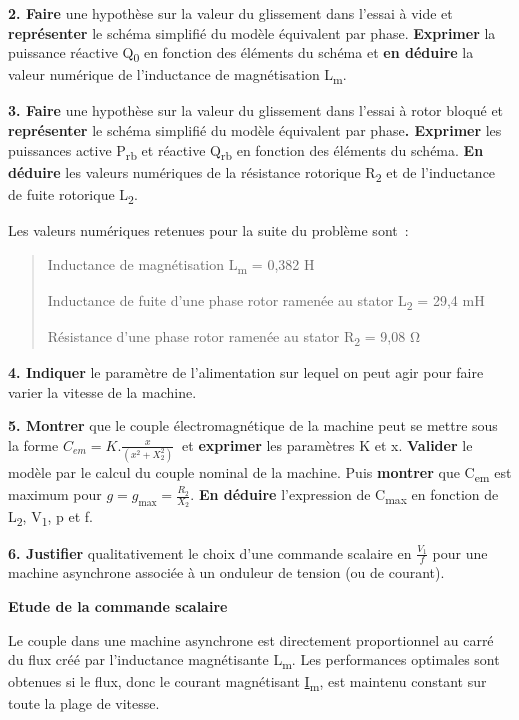 \textbf{2. Faire} une hypothèse sur la valeur du glissement dans l'essai à vide et \textbf{représenter} le schéma simplifié du modèle équivalent par phase. \textbf{Exprimer} la puissance réactive Q\textsubscript{0} en fonction des éléments du schéma et \textbf{en déduire} la valeur numérique de l'inductance de magnétisation L\textsubscript{m}.

\textbf{3. Faire} une hypothèse sur la valeur du glissement dans l'essai à rotor bloqué et \textbf{représenter} le schéma simplifié du modèle équivalent par phase\textbf{. Exprimer} les puissances active P\textsubscript{rb} et réactive Q\textsubscript{rb} en fonction des éléments du schéma. \textbf{En déduire} les valeurs numériques de la résistance rotorique R\textsubscript{2} et de l'inductance de fuite rotorique L\textsubscript{2}.

Les valeurs numériques retenues pour la suite du problème sont~:

\begin{quote}
Inductance de magnétisation L\textsubscript{m} = 0,382 H

Inductance de fuite d'une phase rotor ramenée au stator L\textsubscript{2} = 29,4 mH

Résistance d'une phase rotor ramenée au stator R\textsubscript{2} = 9,08 Ω
\end{quote}

\textbf{4. Indiquer} le paramètre de l'alimentation sur lequel on peut agir pour faire varier la vitesse de la machine.

\textbf{5. Montrer} que le couple électromagnétique de la machine peut se mettre sous la forme \(C_{em} = K.\frac{x}{(x^{2} + X_{2}^{2})}\ \) et \textbf{exprimer} les paramètres K et x. \textbf{Valider} le modèle par le calcul du couple nominal de la machine. Puis \textbf{montrer} que C\textsubscript{em} est maximum pour \(g = g_{\max} = \frac{R_{2}}{X_{2}}\). \textbf{En déduire} l'expression de C\textsubscript{max} en fonction de L\textsubscript{2}, V\textsubscript{1}, p et f.

\textbf{6. Justifier} qualitativement le choix d'une commande scalaire en \(\frac{V_{1}}{f}\) pour une machine asynchrone associée à un onduleur de tension (ou de courant).

\textbf{Etude de la commande scalaire}

Le couple dans une machine asynchrone est directement proportionnel au carré du flux créé par l'inductance magnétisante L\textsubscript{m}. Les performances optimales sont obtenues si le flux, donc le courant magnétisant \ul{I}\textsubscript{m}, est maintenu constant sur toute la plage de vitesse.

